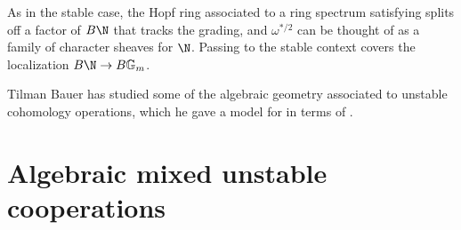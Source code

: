 
\begin{remark}
As in the stable case, the Hopf ring associated to a ring spectrum satisfying {\UFH} splits off a factor of \(B\N\) that tracks the grading, and \(\omega^{*/2}\) can be thought of as a family of character sheaves for \(\N\).
Passing to the stable context covers the localization \(B\N \to B\Gm\).
\end{remark}

\begin{remark}
Tilman Bauer has studied some of the algebraic geometry associated to unstable cohomology operations, which he gave a model for in terms of .
\end{remark}










\section{Algebraic mixed unstable cooperations}\label{UnstableAlgebraicModelSection}

